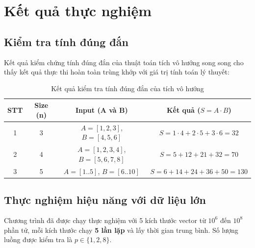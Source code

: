 \section{Kết quả thực nghiệm}

\subsection*{Kiểm tra tính đúng đắn}
Kết quả kiểm chứng tính đúng đắn của thuật toán tích vô hướng song song cho thấy kết quả thực thi hoàn toàn trùng khớp với giá trị tính toán lý thuyết:

\begin{table}[h!]
  \centering
  \caption{Kết quả kiểm tra tính đúng đắn của tích vô hướng}
  \vspace{0.2cm}
  \begin{tabular}{cccc}
    \toprule
    \textbf{STT} & \textbf{Size (n)} & \textbf{Input (A và B)}            & \textbf{Kết quả ($S = A \cdot B$)}           \\
    \midrule
    1            & 3                 & $A=[1, 2, 3]$, $B=[4, 5, 6]$       & $S = 1{\cdot}4 + 2{\cdot}5 + 3{\cdot}6 = 32$ \\
    2            & 4                 & $A=[1, 2, 3, 4]$, $B=[5, 6, 7, 8]$ & $S = 5 + 12 + 21 + 32 = 70$                  \\
    3            & 5                 & $A=[1..5]$, $B=[6..10]$            & $S = 6 + 14 + 24 + 36 + 50 = 130$            \\
    \bottomrule
  \end{tabular}
\end{table}

\subsection*{Thực nghiệm hiệu năng với dữ liệu lớn}
Chương trình đã được chạy thực nghiệm với 5 kích thước vector từ $10^6$ đến $10^8$ phần tử, mỗi kích thước chạy \textbf{5 lần lặp} và lấy thời gian trung bình. Số lượng luồng được kiểm tra là $p \in \{1, 2, 8\}$.


